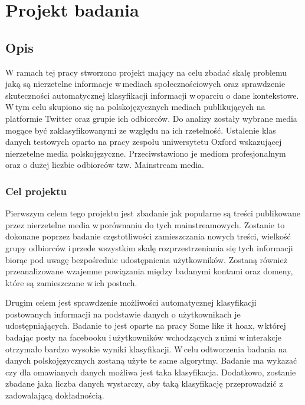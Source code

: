 \newpage
\section{Projekt badania}
\subsection{Opis}
W ramach tej pracy stworzono projekt mający na celu zbadać skalę problemu jaką są nierzetelne informacje w\,mediach społecznościowych oraz sprawdzenie skuteczności automatycznej klasyfikacji informacji w\,oparciu o dane kontekstowe.  W\,tym celu skupiono się na polskojęzycznych mediach publikujących na platformie Twitter oraz grupie ich odbiorców. Do analizy zostały wybrane media mogące być zaklasyfikowanymi ze względu na ich rzetelność. Ustalenie klas danych testowych oparto na pracy zespołu uniwersytetu Oxford wskazującej nierzetelne media polskojęzyczne. Przeciwstawiono je mediom profesjonalnym oraz o dużej liczbie odbiorców tzw. Mainstream media.
\subsubsection{Cel projektu}
Pierwszym celem tego projektu jest zbadanie jak popularne są treści publikowane przez nierzetelne media w\,porównaniu do tych mainstreamowych. Zostanie to dokonane poprzez badanie częstotliwości zamieszczania nowych treści, wielkość grupy odbiorców i\,przede wszystkim skalę rozprzestrzeniania się tych informacji biorąc pod uwagę bezpośrednie udostępnienia użytkowników. Zostaną również przeanalizowane wzajemne powiązania między badanymi kontami oraz domeny, które są zamieszczane w\,ich postach.
\par
Drugim celem jest sprawdzenie możliwości automatycznej klasyfikacji postowanych informacji na podstawie danych o użytkownikach je udostępniających. Badanie to jest oparte na pracy Some like it hoax, w\,której badając posty na facebooku i\,użytkowników wchodzących z\,nimi w\,interakcje otrzymało bardzo wysokie wyniki klasyfikacji. W\,celu odtworzenia badania na danych polskojęzycznych zostaną użyte te same algorytmy. Badanie ma wykazać czy dla omawianych danych możliwa jest taka klasyfikacja. Dodatkowo, zostanie zbadane jaka liczba danych wystarczy, aby taką klasyfikację przeprowadzić z\,zadowalającą dokładnością. 
